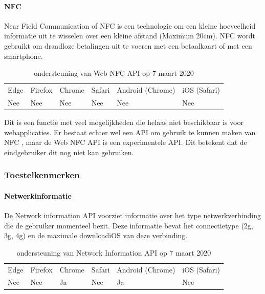 	
	\paragraph{NFC}
	
	Near Field Communication of NFC is een technologie om een kleine hoeveelheid informatie uit te wisselen over een kleine afstand (Maximum 20cm). NFC wordt gebruikt om draadloze betalingen uit te voeren met een betaalkaart of met een smartphone. 
	\autocite{Paus2007}
	
	\begin{table}[H]
		\centering
		\begin{tabular}{llllll}
			Edge & Firefox & Chrome & Safari & Android (Chrome) & iOS (Safari) \\
			Nee   & Nee      &  Nee     & Nee     & Nee               & Nee          
		\end{tabular}	
		\caption{ondersteuning van Web NFC API op 7 maart 2020}
	\end{table}
	
	Dit is een functie met veel mogelijkheden die helaas niet beschikbaar is voor webapplicaties.
	Er bestaat echter wel een API om gebruik te kunnen maken van NFC \autocite{RohdeChristiansen2020}, maar de Web NFC API is een experimentele API. Dit betekent dat de eindgebruiker dit nog niet kan gebruiken.
	
	
	
	\subsubsection{Toestelkenmerken}
	
	
	\paragraph{Netwerkinformatie}
	
	De Network information API \autocite{Lamouri2014} voorziet informatie over het type netwerkverbinding die de gebruiker momenteel bezit. Deze informatie bevat het connectietype (2g, 3g, 4g) en de maximale downloadiOS van deze verbinding.
	
	\begin{table}[H]
		\centering
		\begin{tabular}{llllll}
			Edge & Firefox & Chrome & Safari & Android (Chrome) & iOS (Safari) \\
			Nee   & Nee      &  Ja     & Nee     & Ja               & Nee          
		\end{tabular}	
		\caption{ondersteuning van Network Information API op 7 maart 2020}
	\end{table}
	

